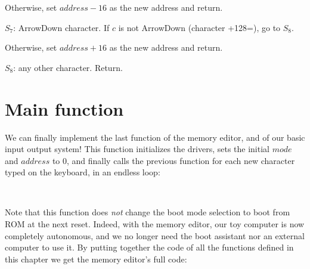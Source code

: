\begin{paracol}{2}

Otherwise, set $address - 16$ as the new address and return.


$S_7$: ArrowDown character. If $c$ is not ArrowDown (character
+128=), go to $S_8$.


Otherwise, set $address + 16$ as the new address and return.


$S_8$: any other character. Return.

\end{paracol}

\section{Main function}

We can finally implement the last function of the memory editor, and of our
basic input output system! This function initializes the drivers, sets the
initial $mode$ and $address$ to 0, and finally calls the previous function for
each new character typed on the keyboard, in an endless loop:

\begin{TwoColumns}
\\
\end{TwoColumns}

Note that this function does {\em not} change the boot mode selection to boot
from ROM at the next reset. Indeed, with the memory editor, our toy computer is
now completely autonomous, and we no longer need the boot assistant nor an
external computer to use it. By putting together the code of all the functions
defined in this chapter we get the memory editor's full code:

